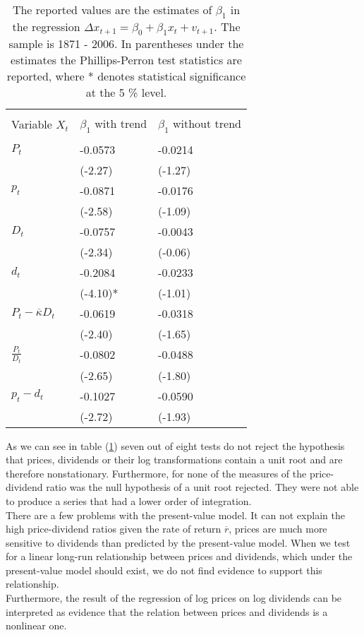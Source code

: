 \documentclass{article}
\begin{document}
\begin{table}[h!]
\centering
\begin{tabular}{l | l l }
\hline \\
Variable $X_t$ & $\beta_1$ with trend & $\beta_1$ without trend \\
\hline \\
$P_t $ & -0.0573 & -0.0214 \\
 & (-2.27) & (-1.27)\\
$p_t $ & -0.0871 & -0.0176  \\
 & (-2.58)  & (-1.09)\\
$D_t$ & -0.0757 & -0.0043 \\
 & (-2.34) & (-0.06) \\
$d_t$ & -0.2084 & -0.0233 \\
 & (-4.10)* & (-1.01) \\
$P_t - \overline{\kappa} D_t$ & -0.0619 & -0.0318 \\
 & (-2.40) & (-1.65) \\
$\frac{P_t}{D_t}$ & -0.0802 &  -0.0488 \\
 & (-2.65)& (-1.80) \\
$p_t - d_t$ &-0.1027 & -0.0590 \\
 & (-2.72)& (-1.93)\\
\hline 
\end{tabular}
\caption{The reported values are the estimates of $\beta_1$ in the regression $\Delta x_{t+1} = \beta_0 + \beta_1 x_t + v_{t+1} $. The sample is 1871 - 2006. In parentheses under the estimates the Phillips-Perron test statistics are reported, where * denotes statistical significance at the 5 \% level.}
\label{cointegrationpv}
\end{table}
As we can see in table (\ref{cointegrationpv}) seven out of eight tests do not reject the hypothesis that prices, dividends or their log transformations contain a unit root and are therefore nonstationary. Furthermore, for none of the measures of the price-dividend ratio was the null hypothesis of a unit root rejected. They were not able to produce a series that had a lower order of integration.  
\\

There are a few problems with the present-value model. It can not explain the high price-dividend ratios given the rate of return $\overline{r}$, prices are much more sensitive to dividends than predicted by the present-value model. When we test for a linear long-run relationship between prices and dividends, which under the present-value model should exist, we do not find evidence to support this relationship.  \\
 Furthermore, the result of the  regression of log prices on log dividends can be interpreted as evidence that the relation between prices and dividends is a nonlinear one.  
\end{document}

